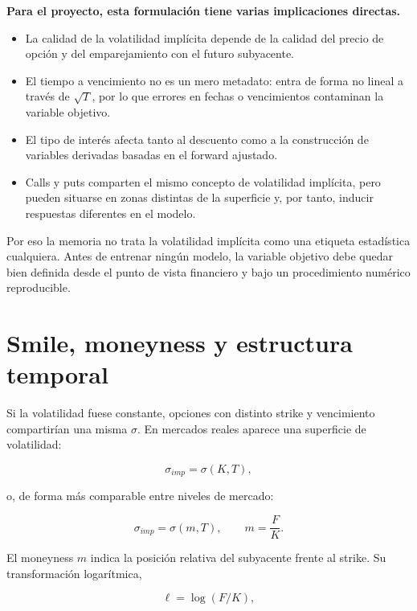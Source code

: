 \textbf{Para el proyecto, esta formulación tiene varias implicaciones directas.}

\begin{itemize}
  \item La calidad de la volatilidad implícita depende de la calidad del precio de opción y del emparejamiento con el futuro subyacente.
  \item El tiempo a vencimiento no es un mero metadato: entra de forma no lineal a través de \(\sqrt{T}\), por lo que errores en fechas o vencimientos contaminan la variable objetivo.
  \item El tipo de interés afecta tanto al descuento como a la construcción de variables derivadas basadas en el forward ajustado.
  \item Calls y puts comparten el mismo concepto de volatilidad implícita, pero pueden situarse en zonas distintas de la superficie y, por tanto, inducir respuestas diferentes en el modelo.
\end{itemize}

Por eso la memoria no trata la volatilidad implícita como una etiqueta estadística cualquiera. Antes de entrenar ningún modelo, la variable objetivo debe quedar bien definida desde el punto de vista financiero y bajo un procedimiento numérico reproducible.

\section{Smile, moneyness y estructura temporal}
\label{sec:smile}

Si la volatilidad fuese constante, opciones con distinto strike y vencimiento compartirían una misma \(\sigma\). En mercados reales aparece una superficie de volatilidad:

\begin{equation}
\sigma_{imp} = \sigma(K,T),
\label{eq:surface}
\end{equation}

o, de forma más comparable entre niveles de mercado:

\begin{equation}
\sigma_{imp} = \sigma(m,T),
\qquad
m=\frac{F}{K}.
\label{eq:moneyness}
\end{equation}

El moneyness \(m\) indica la posición relativa del subyacente frente al strike. Su transformación logarítmica,

\begin{equation}
\ell=\log(F/K),
\label{eq:logmoneyness}
\end{equation}


